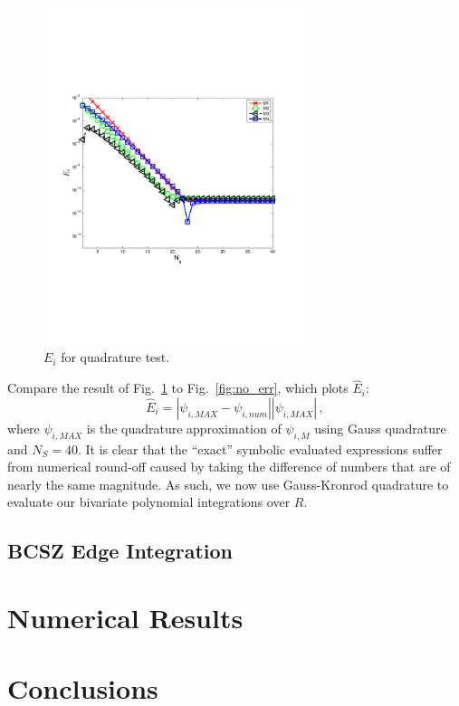 \documentclass{mc2015}
\newcommand{\fig}[1]{Fig.~\ref{#1}}                      %
\newcommand{\benum}{\begin{equation}} 			%
\newcommand{\eenum}{\end{equation}}
\newcommand{\abs}[1]{\ensuremath{\left\lvert #1 \right\rvert}}
\newcommand{\pec}{\, ,}
\begin{document}
\begin{figure}[h]
\centering
\includegraphics[width=3in,trim=0.5in  2.5in  1.in 2.5in,clip=true]{err_gauss_to_matlab_exact.pdf}
\caption{$E_i$ for quadrature test.}
\label{fig:quad_err}
\end{figure}
Compare the result of \fig{fig:quad_err} to \fig{fig:no_err}, which plots $\widehat{E}_i$:  
\benum
\widehat{E}_{i} = \abs{ \psi_{i,MAX} - \psi_{i,num} }{\abs{\psi_{i,MAX} }} \pec
\eenum
where $\psi_{i,MAX}$ is the quadrature approximation of $\psi_{i,M}$ using Gauss quadrature and $N_S = 40$.
It is clear that the ``exact'' symbolic evaluated expressions suffer from numerical round-off caused by taking the difference of numbers that are of nearly the same magnitude.  
As such, we now use Gauss-Kronrod\cite{gk_quad} quadrature to evaluate our bivariate polynomial integrations over $R$.  

\subsection{BCSZ Edge Integration}

\section{Numerical Results}
\label{sec:results}

\section{Conclusions}
\label{sec:conclusions}

\end{document}
